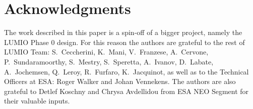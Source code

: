\documentclass{iac} %
\begin{document}

\maketitle{}



\section*{Acknowledgments}
The work described in this paper is a spin-off of a bigger project, namely the LUMIO Phase $0$ design. For this reason the authors are grateful to the rest of LUMIO Team: S.\ Ceccherini, K.\ Mani, V.\ Franzese, A.\ Cervone, P.\ Sundaramoorthy, S.\ Mestry, S.\ Speretta, A.\ Ivanov, D.\ Labate, A.\ Jochemsen, Q.\ Leroy, R.\ Furfaro, K.\ Jacquinot, as well as to the Technical Officers at ESA: Roger Walker and Johan Vennekens. The authors are also grateful to Detlef Koschny and Chrysa Avdellidou from ESA NEO Segment for their valuable inputs.

\printbibliography
\end{document}
